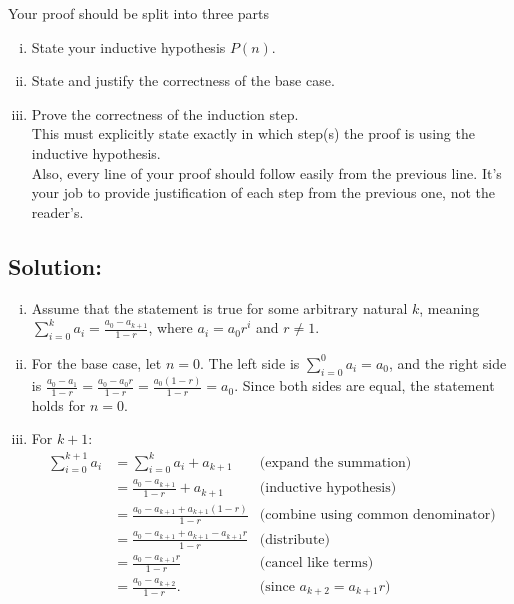 \documentclass[12pt]{article}
\begin{document}
	\medskip

	Your proof should be split into three parts
	\begin{enumerate}[(i)]
		\item State your inductive hypothesis $P(n).$

		\item State and justify the correctness of the base case.

		\item Prove the correctness of the induction step. \\
			This must explicitly state exactly in which step(s) the proof is using the
			inductive hypothesis.\\
			Also, every line of your proof should follow easily from the previous line.
			It's your job to provide justification of each step from the previous one,
			not the reader's.
	\end{enumerate}

	\subsection*{\textbf{Solution:}}
	\begin{enumerate}[(i)]
		\item Assume that the statement is true for some arbitrary natural $k$,
			meaning $\sum_{i=0}^{k}a_{i}=\frac{a_{0}-a_{k+1}}{1-r}$, where $a_{i}=a_{0}
			r^{i}$ and $r\neq1$.

		\item For the base case, let $n=0$. The left side is $\sum_{i=0}^{0}a_{i}=a_{0}$,
			and the right side is
			$\frac{a_{0}-a_{1}}{1-r}=\frac{a_{0}-a_{0}r}{1-r}=\frac{a_{0}(1-r)}{1-r}=a_{0}$.
			Since both sides are equal, the statement holds for $n=0$.

		\item For $k+1$:
			\[
				\begin{aligned}
					\sum_{i=0}^{k+1}a_{i} & =\sum_{i=0}^{k}a_{i}+a_{k+1}              & \text{(expand the summation)}             \\
					                      & =\frac{a_0-a_{k+1}}{1-r}+a_{k+1}          & \text{(inductive hypothesis)}             \\
					                      & =\frac{a_0-a_{k+1}+a_{k+1}(1-r)}{1-r}     & \text{(combine using common denominator)} \\
					                      & =\frac{a_0-a_{k+1}+a_{k+1}-a_{k+1}r}{1-r} & \text{(distribute)}                       \\
					                      & =\frac{a_0-a_{k+1}r}{1-r}                 & \text{(cancel like terms)}                \\
					                      & =\frac{a_0-a_{k+2}}{1-r}.                 & \text{(since }a_{k+2}=a_{k+1}r\text{)}
				\end{aligned}
			\]
	\end{enumerate}
\end{document}
